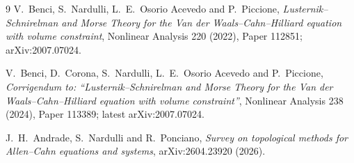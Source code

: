 \documentclass[11pt]{article}
\begin{document}
\begin{thebibliography}{9}
V.~Benci, S.~Nardulli, L.~E.~Osorio Acevedo and P.~Piccione,
\emph{Lusternik--Schnirelman and Morse Theory for the Van der
Waals--Cahn--Hilliard equation with volume constraint},
Nonlinear Analysis 220 (2022), Paper 112851; arXiv:2007.07024.

V.~Benci, D.~Corona, S.~Nardulli, L.~E.~Osorio Acevedo and P.~Piccione,
\emph{Corrigendum to: ``Lusternik--Schnirelman and Morse Theory for the Van
der Waals--Cahn--Hilliard equation with volume constraint''},
Nonlinear Analysis 238 (2024), Paper 113389; latest arXiv:2007.07024.

J.~H.~Andrade, S.~Nardulli and R.~Ponciano,
\emph{Survey on topological methods for Allen--Cahn equations and systems},
arXiv:2604.23920 (2026).
\end{thebibliography}
\end{document}
